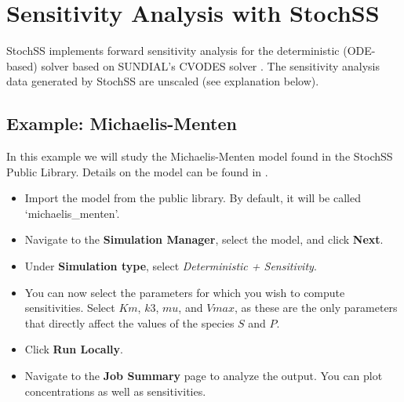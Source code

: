 \chapter{Sensitivity Analysis with StochSS}

%

StochSS implements forward sensitivity analysis for the deterministic (ODE-based) solver based on SUNDIAL's CVODES solver \cite{sundials}. The sensitivity analysis data generated by StochSS are unscaled (see explanation below).

\section{Example: Michaelis-Menten}

In this example we will study the Michaelis-Menten model found in the StochSS Public Library. Details on the model can be found in \cite{wiki-michaelis-menten}.%
\begin{itemize}
\item Import the model from the public library. By default, it will be called `michaelis\_menten'.
\item Navigate to the \textbf{Simulation Manager}, select the model, and click \textbf{Next}.
\item Under \textbf{Simulation type}, select \textit{Deterministic + Sensitivity}.
\item You can now select the parameters for which you wish to compute sensitivities. Select $Km$, $k3$, $mu$, and $Vmax$, as these are the only parameters that directly affect the values of the species $S$ and $P$.
\item Click \textbf{Run Locally}. 
\item Navigate to the \textbf{Job Summary} page to analyze the output. You can plot concentrations as well as sensitivities.
\end{itemize}

